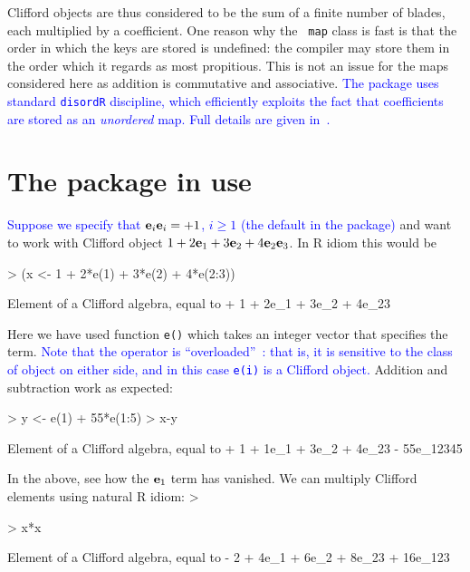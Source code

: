 \documentclass{birkjour}
\theoremstyle{definition}
\theoremstyle{remark}
\numberwithin{equation}{section}
\begin{document}
Clifford objects are thus considered to be the sum of a finite number
of blades, each multiplied by a coefficient.  One reason why the {\tt
  map} class is fast is that the order in which the keys are stored is
undefined: the compiler may store them in the order which it regards
as most propitious.  This is not an issue for the maps considered here
as addition is commutative and associative.  \textcolor{blue}{The
  package uses standard {\tt disordR} discipline, which efficiently
  exploits the fact that coefficients are stored as an {\em unordered}
  map.  Full details are given in~\cite{hankin2022_disordR}.
}

\section{The package in use}

\textcolor{blue}{Suppose we specify that ${\bf e}_{i}{\bf e}_{i}=+1$,
  $i\geqslant 1$ (the default in the package)} and want to work with
Clifford object $1+2{\bf e}_{1}+3{\bf e}_{2}+4{\bf e}_{2}{\bf e}_{3}$.  In R idiom this
would be

\begin{Schunk}
\begin{Sinput}
> (x <- 1 + 2*e(1) + 3*e(2) + 4*e(2:3))
\end{Sinput}
\begin{Soutput}
Element of a Clifford algebra, equal to
+ 1 + 2e_1 + 3e_2 + 4e_23
\end{Soutput}
\end{Schunk}

Here we have used function {\tt e()} which takes an integer vector
that specifies the term.  \textcolor{blue}{Note that the {\tt *}
  operator is ``overloaded''~\cite{stroustrup2013}: that is, it is
  sensitive to the class of object on either side, and in this case
  {\tt e(i)} is a Clifford object.}  Addition and subtraction work as
expected:

\begin{Schunk}
\begin{Sinput}
> y <- e(1) + 55*e(1:5)
> x-y
\end{Sinput}
\begin{Soutput}
Element of a Clifford algebra, equal to
+ 1 + 1e_1 + 3e_2 + 4e_23 - 55e_12345
\end{Soutput}
\end{Schunk}

In the above, see how the ${\bf e}_{1}$ term has vanished.  We can
multiply Clifford elements using natural R idiom:
>
\begin{Schunk}
\begin{Sinput}
> x*x
\end{Sinput}
\begin{Soutput}
Element of a Clifford algebra, equal to
- 2 + 4e_1 + 6e_2 + 8e_23 + 16e_123
\end{Soutput}
\end{Schunk}
\end{document}
